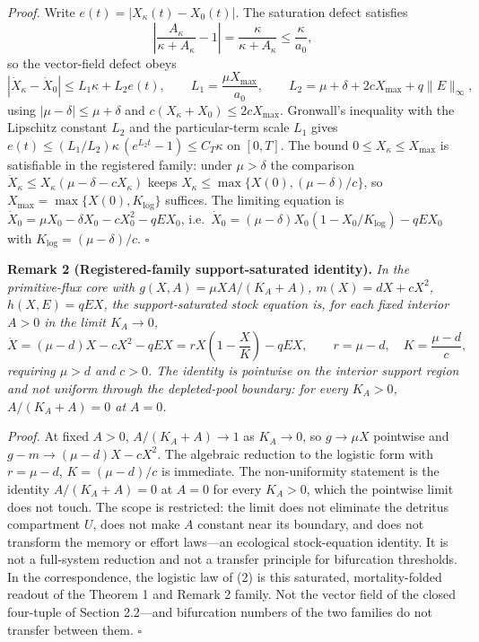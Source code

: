 \documentclass[11pt]{article}
\begin{document}
\emph{Proof.} Write \(e(t) = |X_\kappa(t) - X_0(t)|\). The saturation
defect satisfies
\[\left| \frac{A_\kappa}{\kappa + A_\kappa} - 1 \right| = \frac{\kappa}{\kappa + A_\kappa} \le \frac{\kappa}{a_0},\]
so the vector-field defect obeys
\[|\dot X_\kappa - \dot X_0| \le L_1 \kappa + L_2 e(t), \qquad L_1 = \frac{\mu X_{\max}}{a_0}, \qquad L_2 = \mu + \delta + 2cX_{\max} + q\|E\|_\infty,\]
using \(|\mu - \delta| \le \mu + \delta\) and
\(c(X_\kappa + X_0) \le 2cX_{\max}\). Gronwall's inequality with the
Lipschitz constant \(L_2\) and the particular-term scale \(L_1\) gives
\(e(t) \le (L_1/\allowbreak{}L_2)\kappa\,(e^{L_2 t} - 1) \le C_T \kappa\) on
\([0,T]\). The bound \(0 \le X_\kappa \le X_{\max}\) is satisfiable in
the registered family: under \(\mu > \delta\) the comparison
\(\dot X_\kappa \le X_\kappa(\mu - \delta - cX_\kappa)\) keeps
\(X_\kappa \le \max\{X(0), (\mu-\delta)/c\}\), so
\(X_{\max} = \max\{X(0), K_{\log}\}\) suffices. The limiting equation is
\(\dot X_0 = \mu X_0 - \delta X_0 - cX_0^2 - qE X_0\),
i.e.~\(\dot X_0 = (\mu - \delta)X_0 (1 - X_0/\allowbreak{}K_{\log}) - qE X_0\) with
\(K_{\log} = (\mu - \delta)/c\). \ensuremath{\square}

\textbf{Remark 2 (Registered-family support-saturated identity).}
\emph{In the primitive-flux core with \(g(X,A) = \mu XA/(K_A + A)\),
\(m(X) = dX + cX^2\), \(h(X,E) = qEX\), the support-saturated stock
equation is, for each fixed interior \(A > 0\) in the limit
\(K_A \to 0\),}
\[\dot X = (\mu - d)X - cX^2 - qEX = rX\left(1 - \frac{X}{K}\right) - qEX, \qquad r = \mu - d, \quad K = \frac{\mu - d}{c},\]
\emph{requiring \(\mu > d\) and \(c > 0\). The identity is pointwise on
the interior support region and not uniform through the depleted-pool
boundary: for every \(K_A > 0\), \(A/(K_A + A) = 0\) at \(A = 0\).}

\emph{Proof.} At fixed \(A > 0\), \(A/(K_A + A) \to 1\) as \(K_A \to 0\), so \(g \to \mu X\) pointwise and \(g - m \to (\mu - d)X - cX^2\). The algebraic reduction to the logistic form with \(r = \mu - d\), \(K = (\mu - d)/c\) is immediate. The non-uniformity statement is the identity \(A/(K_A + A) = 0\) at \(A = 0\) for every \(K_A > 0\), which the pointwise limit does not touch. The scope is restricted: the limit does not eliminate the detritus compartment \(U\), does not make \(A\) constant near its boundary, and does not transform the memory or effort laws---an ecological stock-equation identity. It is not a full-system reduction and not a transfer principle for bifurcation thresholds. In the correspondence, the logistic law of (2) is this saturated, mortality-folded readout of the Theorem 1 and Remark 2 family. Not the vector field of the closed four-tuple of Section 2.2---and bifurcation numbers of the two families do not transfer between them. \ensuremath{\square}
\end{document}
